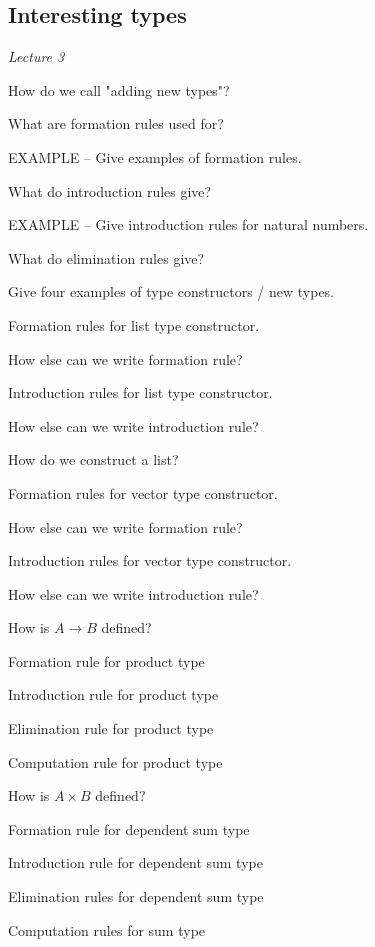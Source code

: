 \documentclass[fleqn]{article}
\begin{document}
\subsection{Interesting types}
\textit{Lecture 3}
\begin{enumerate}
    \item How do we call "adding new types"?
    {\color{green}\item What are formation rules used for?}
    {\color{red}\item EXAMPLE -- Give examples of formation rules.}
    {\color{blue}\item What do introduction rules give?}
    {\color{red}\item EXAMPLE -- Give introduction rules for natural numbers. }
    {\color{blue}\item What do elimination rules give?}
    {\color{red}\item Give four examples of type constructors / new types.}
    {\color{red}\item Formation rules for list type constructor.}
    {\color{green}\item How else can we write formation rule?}
    {\color{red}\item Introduction rules for list type constructor.}
    {\color{red}\item How else can we write introduction rule?}
    \item How do we construct a list?
    {\color{red}\item Formation rules for vector type constructor.}
    {\color{blue}\item How else can we write formation rule?}
    {\color{red}\item Introduction rules for vector type constructor.}
    {\color{red}\item How else can we write introduction rule?}
    {\color{red}\item How is $A \rightarrow B$ defined?}
    {\color{green}\item Formation rule for product type}
    {\color{green}\item Introduction rule for product type}
    {\color{green}\item Elimination rule for product type}
    {\color{green}\item Computation rule for product type}
    {\color{red}\item How is $A \times B$ defined?}
    {\color{red}\item Formation rule for dependent sum type}
    {\color{green}\item Introduction rule for dependent sum type}
    {\color{green}\item Elimination rules for dependent sum type}
    {\color{blue}\item Computation rules for sum type}
\end{enumerate}
\end{document}
